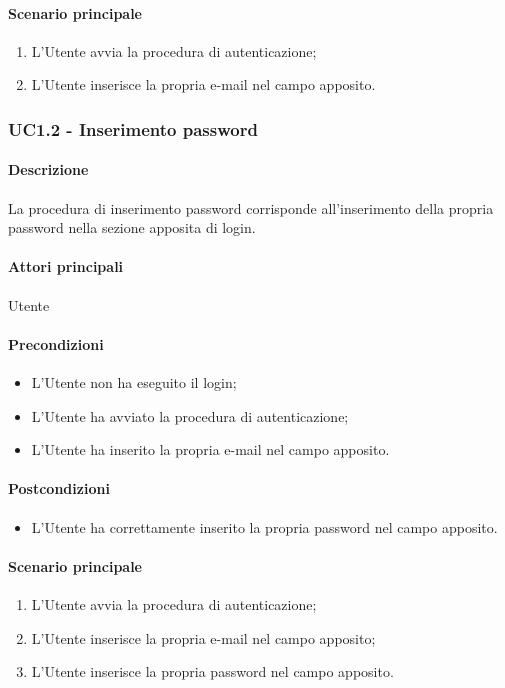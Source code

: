 \paragraph*{Scenario principale}
\begin{enumerate}
  \item L’Utente avvia la procedura di autenticazione;
  \item L’Utente inserisce la propria e-mail nel campo apposito.  
\end{enumerate}


\subsubsection{UC1.2 - Inserimento password}\label{UC1point2}
\paragraph*{Descrizione}
La procedura di inserimento password corrisponde all’inserimento della propria password nella sezione apposita di login.

\paragraph*{Attori principali}
Utente

\paragraph*{Precondizioni}
\begin{itemize}
  \item L’Utente non ha eseguito il login;
  \item L’Utente ha avviato la procedura di autenticazione;
  \item L’Utente ha inserito la propria e-mail nel campo apposito.
\end{itemize}

\paragraph*{Postcondizioni}
\begin{itemize}
  \item L’Utente ha correttamente inserito la propria password nel campo apposito.
\end{itemize}

\paragraph*{Scenario principale}
\begin{enumerate}
  \item L’Utente avvia la procedura di autenticazione;
  \item L’Utente inserisce la propria e-mail nel campo apposito;
  \item L’Utente inserisce la propria password nel campo apposito.  
\end{enumerate}
